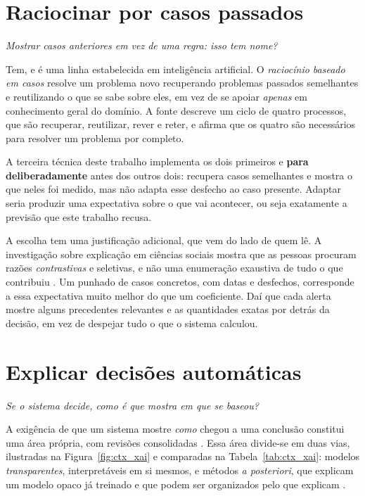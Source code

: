 \section{Raciocinar por casos passados}
\label{sec:ctx_casos}

\emph{Mostrar casos anteriores em vez de uma regra: isso tem nome?}

Tem, e é uma linha estabelecida em inteligência artificial. O \emph{raciocínio baseado em casos}
\autocite{aamodt1994cbr} resolve um problema novo recuperando problemas passados semelhantes e
reutilizando o que se sabe sobre eles, em vez de se apoiar \emph{apenas} em conhecimento geral do
domínio. A fonte descreve um ciclo de quatro processos, que são recuperar, reutilizar, rever e reter,
e afirma que os quatro são necessários para resolver um problema por completo.

A terceira técnica deste trabalho implementa os dois primeiros e \textbf{para deliberadamente} antes
dos outros dois: recupera casos semelhantes e mostra o que neles foi medido, mas não adapta esse
desfecho ao caso presente. Adaptar seria produzir uma expectativa sobre o que vai acontecer, ou seja
exatamente a previsão que este trabalho recusa.

A escolha tem uma justificação adicional, que vem do lado de quem lê. A investigação sobre explicação
em ciências sociais mostra que as pessoas procuram razões \emph{contrastivas} e seletivas, e não uma
enumeração exaustiva de tudo o que contribuiu \autocite{miller2019explanation}. Um punhado de casos
concretos, com datas e desfechos, corresponde a essa expectativa muito melhor do que um coeficiente.
Daí que cada alerta mostre alguns precedentes relevantes e as quantidades exatas por detrás da
decisão, em vez de despejar tudo o que o sistema calculou.

\section{Explicar decisões automáticas}
\label{sec:ctx_xai}

\emph{Se o sistema decide, como é que mostra em que se baseou?}

A exigência de que um sistema mostre \emph{como} chegou a uma conclusão constitui uma área própria,
com revisões consolidadas \autocite{arrieta2020xai, adadi2018peeking}. Essa área divide-se em duas
vias, ilustradas na Figura~\ref{fig:ctx_xai} e comparadas na Tabela~\ref{tab:ctx_xai}: modelos
\emph{transparentes}, interpretáveis em si mesmos, e métodos \emph{a posteriori}, que explicam um
modelo opaco já treinado e que podem ser organizados pelo que explicam
\autocite{guidotti2018survey}.

